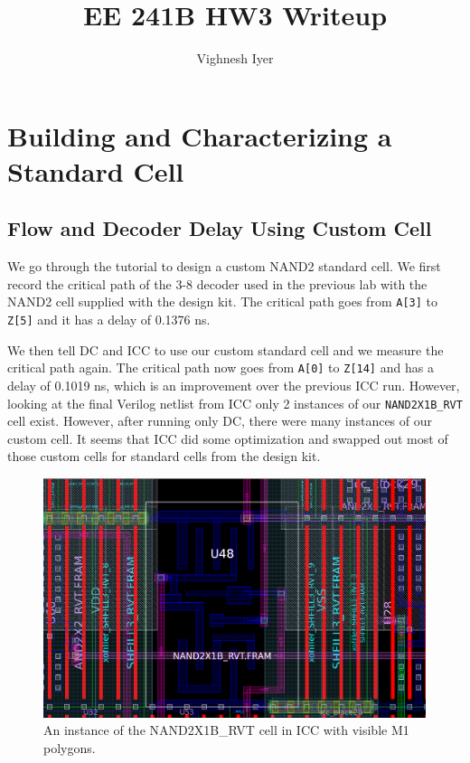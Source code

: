 \documentclass[11pt]{article}
\begin{document}
\title{EE 241B HW3 Writeup}

\author{Vighnesh Iyer}
\date{}
\maketitle

\tableofcontents

\section{Building and Characterizing a Standard Cell}

\subsection{Flow and Decoder Delay Using Custom Cell}
We go through the tutorial to design a custom NAND2 standard cell. We first record the critical path of the 3-8 decoder used in the previous lab with the NAND2 cell supplied with the design kit. The critical path goes from \verb|A[3]| to \verb|Z[5]| and it has a delay of 0.1376 ns.

We then tell DC and ICC to use our custom standard cell and we measure the critical path again. The critical path now goes from \verb|A[0]| to \verb|Z[14]| and has a delay of 0.1019 ns, which is an improvement over the previous ICC run. However, looking at the final Verilog netlist from ICC only 2 instances of our \verb|NAND2X1B_RVT| cell exist. However, after running only DC, there were many instances of our custom cell. It seems that ICC did some optimization and swapped out most of those custom cells for standard cells from the design kit.

\begin{figure}[H]
	\centerline{\includegraphics[height=7cm]{icc_custom_cell.png}}
	\caption{An instance of the NAND2X1B\_RVT cell in ICC with visible M1 polygons.}
\end{figure}
\end{document}
